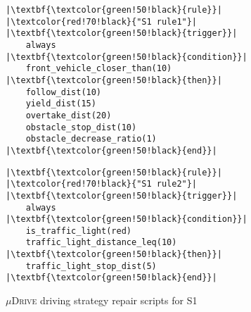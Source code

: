 \begin{figure}[t]
\begin{minipage}[t]{0.48\linewidth}
\begin{verbatim}
|\textbf{\textcolor{green!50!black}{rule}}| |\textcolor{red!70!black}{"S1 rule1"}|
|\textbf{\textcolor{green!50!black}{trigger}}| 
    always 
|\textbf{\textcolor{green!50!black}{condition}}| 
    front_vehicle_closer_than(10)
|\textbf{\textcolor{green!50!black}{then}}|
    follow_dist(10)
    yield_dist(15)
    overtake_dist(20)
    obstacle_stop_dist(10)
    obstacle_decrease_ratio(1)
|\textbf{\textcolor{green!50!black}{end}}|
\end{verbatim}
\end{minipage}
\hfill
\begin{minipage}[t]{0.48\linewidth}
\begin{verbatim}
|\textbf{\textcolor{green!50!black}{rule}}| |\textcolor{red!70!black}{"S1 rule2"}|
|\textbf{\textcolor{green!50!black}{trigger}}| 
    always 
|\textbf{\textcolor{green!50!black}{condition}}| 
    is_traffic_light(red)
    traffic_light_distance_leq(10)
|\textbf{\textcolor{green!50!black}{then}}|
    traffic_light_stop_dist(5)
|\textbf{\textcolor{green!50!black}{end}}|
\end{verbatim}
\end{minipage}
\caption{\textsc{$\mu$Drive} driving strategy repair scripts for S1}
\label{lst:s1 commands}
\vspace{-0.6cm}
\end{figure}


